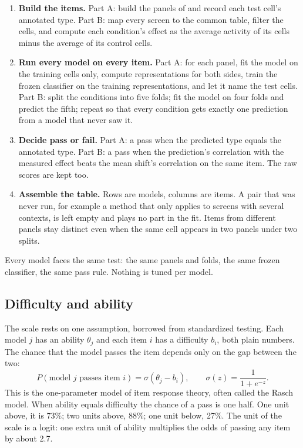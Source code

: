 \documentclass[]{style}
\begin{document}
\begin{enumerate}[leftmargin=1.5em,itemsep=2pt]
\item \textbf{Build the items.} Part A: build the panels of  and record
each test cell's annotated type. Part B: map every screen to the common table, filter the
cells, and compute each condition's effect as the average activity of its cells minus the
average of its control cells.
\item \textbf{Run every model on every item.} Part A: for each panel, fit the model on the
training cells only, compute representations for both sides, train the frozen classifier
on the training representations, and let it name the test cells. Part B: split the
conditions into five folds; fit the model on four folds and predict the fifth; repeat so
that every condition gets exactly one prediction from a model that never saw it.
\item \textbf{Decide pass or fail.} Part A: a pass when the predicted type equals the
annotated type. Part B: a pass when the prediction's correlation with the measured effect
beats the mean shift's correlation on the same item. The raw scores are kept too.
\item \textbf{Assemble the table.} Rows are models, columns are items. A pair that was
never run, for example a method that only applies to screens with several contexts, is
left empty and plays no part in the fit. Items from different panels stay distinct even
when the same cell appears in two panels under two splits.
\end{enumerate}

Every model faces the same test: the same panels and folds, the same frozen classifier,
the same pass rule. Nothing is tuned per model.

\subsection{Difficulty and ability}
\label{sec:model}

The scale rests on one assumption, borrowed from standardized testing. Each model $j$ has
an ability $\theta_j$ and each item $i$ has a difficulty $b_i$, both plain numbers. The
chance that the model passes the item depends only on the gap between the two:
\begin{equation}
P(\text{model } j \text{ passes item } i)=\sigma(\theta_j-b_i),\qquad
\sigma(z)=\frac{1}{1+e^{-z}}.
\label{eq:rasch}
\end{equation}
This is the one-parameter model of item response theory, often called the Rasch model.
When ability equals difficulty the chance of a pass is one half. One unit above, it is
73\%; two units above, 88\%; one unit below, 27\%. The unit of the scale is a logit: one
extra unit of ability multiplies the odds of passing any item by about 2.7.
\end{document}
